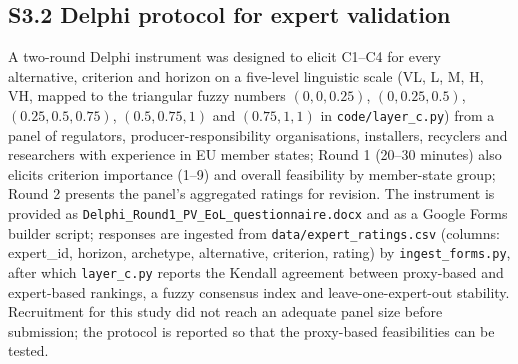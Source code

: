 \documentclass[11pt]{article}
\begin{document}
\subsection*{S3.2 Delphi protocol for expert validation}
A two-round Delphi instrument was designed to elicit C1--C4 for every alternative, criterion and horizon on a five-level linguistic scale (VL, L, M, H, VH, mapped to the triangular fuzzy numbers $(0,0,0.25)$, $(0,0.25,0.5)$, $(0.25,0.5,0.75)$, $(0.5,0.75,1)$ and $(0.75,1,1)$ in \texttt{code/layer\_c.py}) from a panel of regulators, producer-responsibility organisations, installers, recyclers and researchers with experience in EU member states; Round 1 (20--30 minutes) also elicits criterion importance (1--9) and overall feasibility by member-state group; Round 2 presents the panel's aggregated ratings for revision. The instrument is provided as \texttt{Delphi\_Round1\_PV\_EoL\_questionnaire.docx} and as a Google Forms builder script; responses are ingested from \texttt{data/expert\_ratings.csv} (columns: expert\_id, horizon, archetype, alternative, criterion, rating) by \texttt{ingest\_forms.py}, after which \texttt{layer\_c.py} reports the Kendall agreement between proxy-based and expert-based rankings, a fuzzy consensus index and leave-one-expert-out stability. Recruitment for this study did not reach an adequate panel size before submission; the protocol is reported so that the proxy-based feasibilities can be tested.
\end{document}
